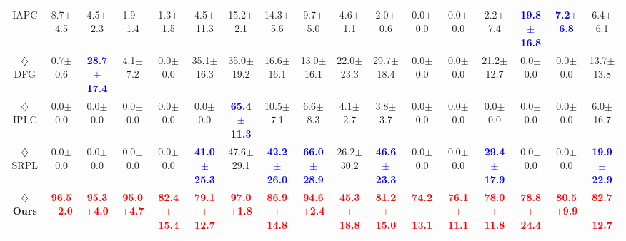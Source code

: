 \begin{table}[ht]
{\begin{tabular}{@{}ccccccccccccccccc@{}}
{ IAPC \cite{IAPC}} & {8.7$\pm$4.5} & {4.5$\pm$2.3} & {1.9$\pm$1.4} & {1.3$\pm$1.5} & {4.5$\pm$11.3} & {15.2$\pm$2.1} & {14.3$\pm$5.6} & { 9.7$\pm$5.0} & {4.6$\pm$1.1} & {2.0$\pm$0.6} & {0.0$\pm$0.0} & {0.0$\pm$0.0} & {2.2$\pm$7.4} & \textcolor{blue}{\textbf{19.8$\pm$16.8}} & \textcolor{blue}{\textbf{7.2$\pm$6.8}} & {6.4$\pm$6.1}\\

{ $\diamondsuit$ DFG \cite{DFG}} &{0.7$\pm$0.6} & \textcolor{blue}{\textbf{28.7$\pm$17.4}} & {4.1$\pm$7.2} & {0.0$\pm$0.0} & {35.1$\pm$16.3} & {35.0$\pm$19.2} & {16.6$\pm$16.1} & {13.0$\pm$16.1} & {22.0$\pm$23.3} & {29.7$\pm$18.4} & {0.0$\pm$0.0} & {0.0$\pm$0.0} & {21.2$\pm$12.7} & {0.0$\pm$0.0} & {0.0$\pm$0.0} & {13.7$\pm$13.8}\\

{ $\diamondsuit$ IPLC \cite{iplc}} & {0.0$\pm$0.0} & {0.0$\pm$0.0} & {0.0$\pm$0.0} & {0.0$\pm$0.0} & {0.0$\pm$0.0} & \textcolor{blue}{\textbf{65.4$\pm$11.3}} & {10.5$\pm$7.1} & {6.6$\pm$8.3} & {4.1$\pm$2.7} & {3.8$\pm$3.7} & {0.0$\pm$0.0} & {0.0$\pm$0.0} & {0.0$\pm$0.0} & {0.0$\pm$0.0} & {0.0$\pm$0.0} & { 6.0$\pm$16.7}\\ 

{ $\diamondsuit$ SRPL \cite{SRPL}} & {0.0$\pm$0.0} & {0.0$\pm$0.0} & {0.0$\pm$0.0} & {0.0$\pm$0.0} & \textcolor{blue}{\textbf{41.0$\pm$25.3}} & {47.6$\pm$29.1} & \textcolor{blue}{\textbf{42.2$\pm$26.0}}& \textcolor{blue}{\textbf{66.0$\pm$28.9}} & {26.2$\pm$30.2} & \textcolor{blue}{\textbf{46.6$\pm$23.3}} & {0.0$\pm$0.0} & {0.0$\pm$0.0} & \textcolor{blue}{\textbf{29.4$\pm$17.9}}  & {0.0$\pm$0.0} & {0.0$\pm$0.0} & \textcolor{blue}{\textbf{19.9$\pm$22.9}} \\ \midrule

\textbf{$\diamondsuit$ Ours} & \textcolor{red}{\textbf{96.5$\pm$2.0}} & \textcolor{red}{\textbf{95.3$\pm$4.0}} & \textcolor{red}{\textbf{95.0$\pm$4.7}} & \textcolor{red}{\textbf{82.4$\pm$15.4}} & \textcolor{red}{\textbf{79.1$\pm$12.7}} & \textcolor{red}{\textbf{97.0$\pm$1.8}} & \textcolor{red}{\textbf{86.9$\pm$14.8}} & \textcolor{red}{\textbf{94.6$\pm$2.4}} & \textcolor{red}{\textbf{45.3$\pm$18.8}} & \textcolor{red}{\textbf{81.2$\pm$15.0}} & \textcolor{red}{\textbf{74.2$\pm$13.1}} & \textcolor{red}{\textbf{76.1$\pm$11.1}} & \textcolor{red}{\textbf{78.0$\pm$11.8}} & \textcolor{red}{\textbf{78.8$\pm$24.4}} & \textcolor{red}{\textbf{80.5$\pm$9.9}} & \textcolor{red}{\textbf{82.7$\pm$12.7}}\\

\bottomrule
\end{tabular}%
}


\end{table}
